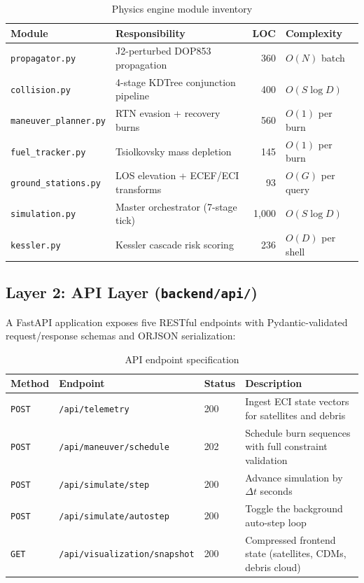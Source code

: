 \documentclass[11pt,a4paper]{article}
\begin{document}
\begin{table}[H]
\centering
\caption{Physics engine module inventory}
\begin{tabular}{@{}llrl@{}}
\toprule
\textbf{Module} & \textbf{Responsibility} & \textbf{LOC} & \textbf{Complexity} \\
\midrule
\texttt{propagator.py}       & J2-perturbed DOP853 propagation    & 360 & $O(N)$ batch \\
\texttt{collision.py}        & 4-stage KDTree conjunction pipeline & 400 & $O(S \log D)$ \\
\texttt{maneuver\_planner.py} & RTN evasion + recovery burns       & 560 & $O(1)$ per burn \\
\texttt{fuel\_tracker.py}    & Tsiolkovsky mass depletion         & 145 & $O(1)$ per burn \\
\texttt{ground\_stations.py} & LOS elevation + ECEF/ECI transforms & 93 & $O(G)$ per query \\
\texttt{simulation.py}       & Master orchestrator (7-stage tick)  & 1,000 & $O(S \log D)$ \\
\texttt{kessler.py}          & Kessler cascade risk scoring       & 236 & $O(D)$ per shell \\
\bottomrule
\end{tabular}
\end{table}

\subsection{Layer 2: API Layer (\texttt{backend/api/})}

A FastAPI application exposes five RESTful endpoints with Pydantic-validated
request/response schemas and ORJSON serialization:

\begin{table}[H]
\centering
\caption{API endpoint specification}
\begin{tabular}{@{}lllp{6cm}@{}}
\toprule
\textbf{Method} & \textbf{Endpoint} & \textbf{Status} & \textbf{Description} \\
\midrule
\texttt{POST} & \texttt{/api/telemetry}              & 200 & Ingest ECI state vectors for satellites and debris \\
\texttt{POST} & \texttt{/api/maneuver/schedule}       & 202 & Schedule burn sequences with full constraint validation \\
\texttt{POST} & \texttt{/api/simulate/step}           & 200 & Advance simulation by $\Delta t$ seconds \\
\texttt{POST} & \texttt{/api/simulate/autostep}       & 200 & Toggle the background auto-step loop \\
\texttt{GET}  & \texttt{/api/visualization/snapshot}   & 200 & Compressed frontend state (satellites, CDMs, debris cloud) \\
\bottomrule
\end{tabular}
\end{table}
\end{document}
